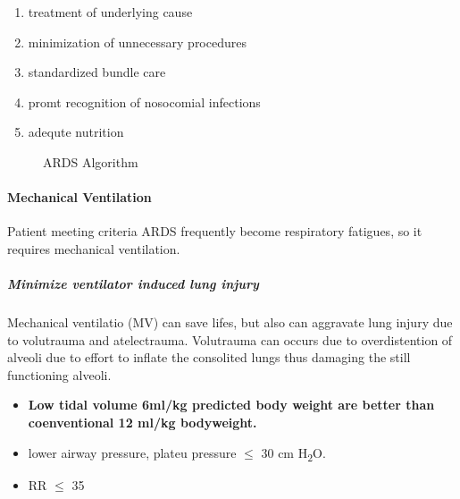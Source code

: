 \documentclass[
  letterpaper,
  DIV=11,
  numbers=noendperiod]{scrreprt}
\let\oldparagraph\paragraph
\renewcommand{\paragraph}[1]{\oldparagraph{#1}\mbox{}}
\let\oldsubparagraph\subparagraph
\renewcommand{\subparagraph}[1]{\oldsubparagraph{#1}\mbox{}}
\providecommand{\tightlist}{%
  \setlength{\itemsep}{0pt}\setlength{\parskip}{0pt}}\usepackage{longtable,booktabs,array}
\begin{document}
\begin{enumerate}
\def\labelenumi{\arabic{enumi}.}
\tightlist
\item
  treatment of underlying cause
\item
  minimization of unnecessary procedures
\item
  standardized bundle care
\item
  promt recognition of nosocomial infections
\item
  adequte nutrition
\end{enumerate}

\begin{figure}


\caption{\label{fig-ardsalgorithm}ARDS Algorithm}

\end{figure}%

\paragraph{Mechanical Ventilation}\label{mechanical-ventilation-1}

Patient meeting criteria ARDS frequently become respiratory fatigues, so
it requires mechanical ventilation.

\subparagraph{Minimize ventilator induced lung
injury}\label{minimize-ventilator-induced-lung-injury}

Mechanical ventilatio (MV) can save lifes, but also can aggravate lung
injury due to volutrauma and atelectrauma. Volutrauma can occurs due to
overdistention of alveoli due to effort to inflate the consolited lungs
thus damaging the still functioning alveoli.

\begin{itemize}
\tightlist
\item
  \textbf{Low tidal volume 6ml/kg predicted body weight are better than
  coenventional 12 ml/kg bodyweight.}
\item
  lower airway pressure, plateu pressure \(\le\) 30 cm
  H\textsubscript{2}O.
\item
  RR \(\le\) 35
\end{itemize}
\end{document}
